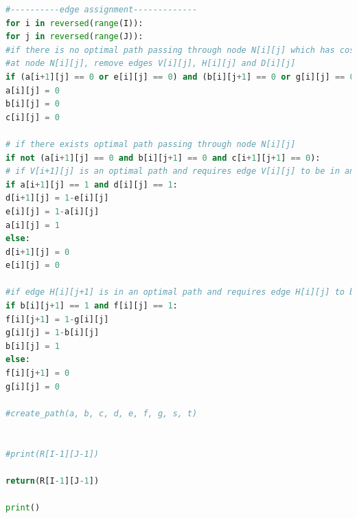 \documentclass{article}
\begin{document}
\begin{lstlisting}[language=python]
#----------edge assignment-------------
for i in reversed(range(I)):
for j in reversed(range(J)):
#if there is no optimal path passing through node N[i][j] which has cost R[i][j]
#at node N[i][j], remove edges V[i][j], H[i][j] and D[i][j]
if (a[i+1][j] == 0 or e[i][j] == 0) and (b[i][j+1] == 0 or g[i][j] == 0) and (c[i+1][j+1] == 0):
a[i][j] = 0
b[i][j] = 0
c[i][j] = 0

# if there exists optimal path passing through node N[i][j]
if not (a[i+1][j] == 0 and b[i][j+1] == 0 and c[i+1][j+1] == 0):
# if V[i+1][j] is an optimal path and requires edge V[i][j] to be in an optimal path, determine if an optimal path that uses edge V[i+1][j] must use edge V[i][j] and the converse:
if a[i+1][j] == 1 and d[i][j] == 1:
d[i+1][j] = 1-e[i][j]
e[i][j] = 1-a[i][j]
a[i][j] = 1
else:
d[i+1][j] = 0
e[i][j] = 0

#if edge H[i][j+1] is in an optimal path and requires edge H[i][j] to be in an optimal path, determine if an optimal path that uses edge H[i][j+1] must use edge H[i][j] and the converse:
if b[i][j+1] == 1 and f[i][j] == 1:
f[i][j+1] = 1-g[i][j]
g[i][j] = 1-b[i][j]
b[i][j] = 1
else:
f[i][j+1] = 0
g[i][j] = 0

#create_path(a, b, c, d, e, f, g, s, t)


#print(R[I-1][J-1])

return(R[I-1][J-1])

print()
		
	\end{lstlisting}
	
	
	
\end{document}
